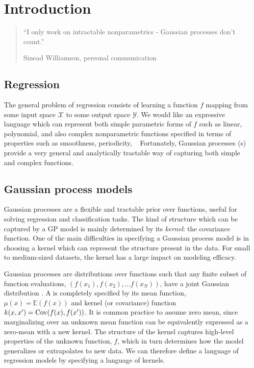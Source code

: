 
\inbpdocument

\chapter{Introduction}
\label{ch:intro}


\begin{quotation}
``I only work on intractable nonparametrics - Gaussian processes don't count.''

\hspace*{\fill} Sinead Williamson, personal communication
\end{quotation}


\section{Regression}

The general problem of regression consists of learning a function $f$ mapping from some input space $\mathcal{X}$ to some output space $\mathcal{Y}$.
We would like an expressive language which can represent both simple parametric forms of $f$ such as linear, polynomial, \etc and also complex nonparametric functions specified in terms of properties such as smoothness, periodicity, \etc~ 
Fortunately, Gaussian processes (\gp{}s) provide a very general and analytically tractable way of capturing both simple and complex functions. 

\section{Gaussian process models}


Gaussian processes are a flexible and tractable prior over functions, useful for solving regression and classification tasks\cite{rasmussen38gaussian}.  The kind of structure which can be captured by a GP model is mainly determined by its \emph{kernel}: the covariance function.  One of the main difficulties in specifying a Gaussian process model is in choosing a kernel which can represent the structure present in the data.  For small to medium-sized datasets, the kernel has a large impact on modeling efficacy.

Gaussian processes are distributions over functions such that any finite subset of function evaluations, $(f(x_1), f(x_2), \ldots f(x_N))$, have a joint Gaussian distribution \citep{rasmussen38gaussian}.
A \gp{} is completely specified by its mean function, $\mu(x)=\mathbb{E}(f(x))$ and kernel (or covariance) function $k(x,x') = \operatorname{Cov}(f(x),f(x'))$.
It is common practice to assume zero mean, since marginalizing over an unknown mean function can be equivalently expressed as a zero-mean \gp{} with a new kernel.
The structure of the kernel captures high-level properties of the unknown function, $f$, which in turn determines how the model generalizes or extrapolates to new data.
We can therefore define a language of regression models by specifying a language of kernels.

